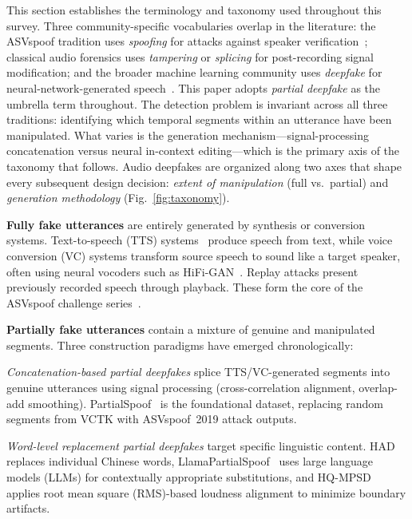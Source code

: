 \documentclass[journal]{IEEEtran}
\begin{document}
This section establishes the terminology and taxonomy used throughout this survey. Three community-specific vocabularies overlap in the literature: the ASVspoof tradition uses \emph{spoofing} for attacks against speaker verification~\cite{wu2015spoofing,wang2020asvspoof2019}; classical audio forensics uses \emph{tampering} or \emph{splicing} for post-recording signal modification; and the broader machine learning community uses \emph{deepfake} for neural-network-generated speech~\cite{almutairi2022review,muller2022does}. This paper adopts \emph{partial deepfake} as the umbrella term throughout. The detection problem is invariant across all three traditions: identifying which temporal segments within an utterance have been manipulated. What varies is the generation mechanism---signal-processing concatenation versus neural in-context editing---which is the primary axis of the taxonomy that follows. Audio deepfakes are organized along two axes that shape every subsequent design decision: \emph{extent of manipulation} (full vs.\ partial) and \emph{generation methodology} (Fig.~\ref{fig:taxonomy}).

\textbf{Fully fake utterances} are entirely generated by synthesis or conversion systems. Text-to-speech (TTS) systems~\cite{tan2021ttssurvey} produce speech from text, while voice conversion (VC) systems transform source speech to sound like a target speaker, often using neural vocoders such as HiFi-GAN~\cite{kong2020hifi}. Replay attacks present previously recorded speech through playback. These form the core of the ASVspoof challenge series~\cite{wang2020asvspoof2019}.

\textbf{Partially fake utterances} contain a mixture of genuine and manipulated segments. Three construction paradigms have emerged chronologically:

\emph{Concatenation-based partial deepfakes} splice TTS/VC-generated segments into genuine utterances using signal processing (cross-correlation alignment, overlap-add smoothing). PartialSpoof~\cite{zhang2023partialspoof} is the foundational dataset, replacing random segments from VCTK with ASVspoof~2019 attack outputs.

\emph{Word-level replacement partial deepfakes} target specific linguistic content. HAD~\cite{yi2021had} replaces individual Chinese words, LlamaPartialSpoof~\cite{luong2025llamapartialspoof} uses large language models (LLMs) for contextually appropriate substitutions, and HQ-MPSD~\cite{li2025hqmpsd} applies root mean square (RMS)-based loudness alignment to minimize boundary artifacts.
\end{document}
